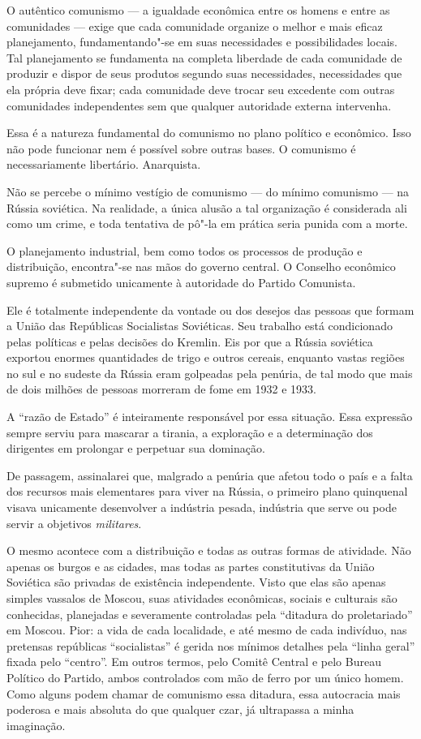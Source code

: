 O autêntico comunismo --- a igualdade econômica entre os homens e entre as
comunidades --- exige que cada comunidade organize o melhor e mais eficaz
planejamento, fundamentando"-se em suas necessidades e possibilidades
locais. Tal planejamento se fundamenta na completa liberdade de cada
comunidade de produzir e dispor de seus produtos segundo suas
necessidades, necessidades que ela própria deve fixar; cada comunidade
deve trocar seu excedente com outras comunidades independentes sem que
qualquer autoridade externa intervenha.

Essa é a natureza fundamental do comunismo no plano político e econômico.
Isso não pode funcionar nem é possível sobre outras bases. O
comunismo é necessariamente libertário. Anarquista.

Não se percebe o mínimo vestígio de comunismo --- do mínimo
comunismo --- na Rússia soviética. Na realidade, a única alusão a tal
organização é considerada ali como um crime, e toda tentativa de
pô"-la em prática seria punida com a morte.

O planejamento industrial, bem como todos os processos de produção e
distribuição, encontra"-se nas mãos do governo central. O Conselho
econômico supremo é submetido unicamente à autoridade do Partido
Comunista.

Ele é totalmente independente da vontade ou dos desejos das pessoas que
formam a União das Repúblicas Socialistas Soviéticas. Seu trabalho está
condicionado pelas políticas e pelas decisões do Kremlin. Eis por que a
Rússia soviética exportou enormes quantidades de trigo e outros cereais,
enquanto vastas regiões no sul e no sudeste da Rússia eram golpeadas
pela penúria, de tal modo que mais de dois milhões de pessoas morreram
de fome em 1932 e 1933.

A “razão de Estado” é inteiramente responsável por essa situação. Essa
expressão sempre serviu para mascarar a tirania, a exploração e a
determinação dos dirigentes em prolongar e perpetuar sua dominação.

De passagem, assinalarei que, malgrado a penúria que afetou todo o país
e a falta dos recursos mais elementares para viver na Rússia, o
primeiro plano quinquenal visava unicamente desenvolver a indústria
pesada, indústria que serve ou pode servir a objetivos \textit{militares}. 

O mesmo acontece com a distribuição e todas as outras formas de
atividade. Não apenas os burgos e as cidades, mas todas as partes
constitutivas da União Soviética são privadas de existência
independente. Visto que elas são apenas simples vassalos de Moscou,
suas atividades econômicas, sociais e culturais são conhecidas,
planejadas e severamente controladas pela “ditadura do proletariado” em
Moscou. Pior: a vida de cada localidade, e até mesmo de cada indivíduo,
nas pretensas repúblicas “socialistas” é gerida nos mínimos detalhes
pela “linha geral” fixada pelo “centro”. Em outros termos, pelo Comitê
Central e pelo Bureau Político do Partido, ambos controlados com mão de
ferro por um único homem. Como alguns podem chamar de comunismo essa
ditadura, essa autocracia mais poderosa e mais absoluta do que qualquer
czar, já ultrapassa a minha imaginação.
